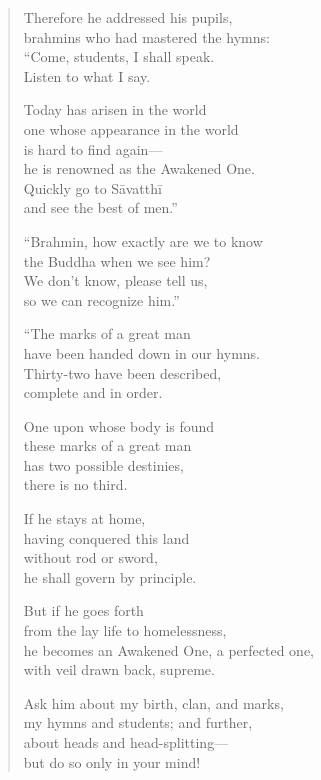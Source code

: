 \documentclass[12pt,openany]{book}%
\begin{document}
\begin{verse}
Therefore he addressed his pupils, \\
brahmins who had mastered the hymns: \\
“Come, students, I shall speak. \\
Listen to what I say. 

Today has arisen in the world \\
one whose appearance in the world \\
is hard to find again—\\
he is renowned as the Awakened One. \\
Quickly go to \textsanskrit{Sāvatthī} \\
and see the best of men.” 

“Brahmin, how exactly are we to know \\
the Buddha when we see him? \\
We don’t know, please tell us, \\
so we can recognize him.” 

“The marks of a great man \\
have been handed down in our hymns. \\
Thirty-two have been described, \\
complete and in order. 

One upon whose body is found \\
these marks of a great man \\
has two possible destinies, \\
there is no third. 

If he stays at home, \\
having conquered this land \\
without rod or sword, \\
he shall govern by principle. 

But if he goes forth \\
from the lay life to homelessness, \\
he becomes an Awakened One, a perfected one, \\
with veil drawn back, supreme. 

Ask him about my birth, clan, and marks, \\
my hymns and students; and further, \\
about heads and head-splitting—\\
but do so only in your mind! 


\end{verse}
\end{document}
